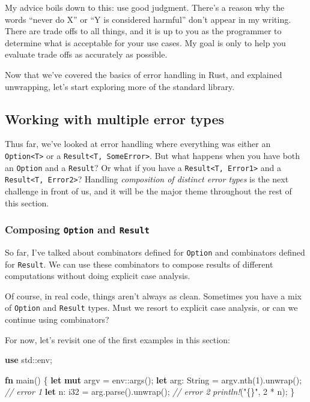 \documentclass[a4paper,]{book}
\renewcommand*{\hypertarget}[3][\ar]{%
  \def\ar{#2}%
  \label{#1}%
  #3}
\newenvironment{Shaded}{\begin{snugshade}}{\end{snugshade}}
\newcommand{\KeywordTok}[1]{\textcolor[rgb]{0.13,0.29,0.53}{\textbf{{#1}}}}
\newcommand{\DataTypeTok}[1]{\textcolor[rgb]{0.13,0.29,0.53}{{#1}}}
\newcommand{\DecValTok}[1]{\textcolor[rgb]{0.00,0.00,0.81}{{#1}}}
\newcommand{\StringTok}[1]{\textcolor[rgb]{0.31,0.60,0.02}{{#1}}}
\newcommand{\CommentTok}[1]{\textcolor[rgb]{0.56,0.35,0.01}{\textit{{#1}}}}
\newcommand{\PreprocessorTok}[1]{\textcolor[rgb]{0.56,0.35,0.01}{\textit{{#1}}}}
\newcommand{\NormalTok}[1]{{#1}}
\begin{document}
My advice boils down to this: use good judgment. There's a reason why
the words ``never do X'' or ``Y is considered harmful'' don't appear in
my writing. There are trade offs to all things, and it is up to you as
the programmer to determine what is acceptable for your use cases. My
goal is only to help you evaluate trade offs as accurately as possible.

Now that we've covered the basics of error handling in Rust, and
explained unwrapping, let's start exploring more of the standard
library.

\hypertarget{working-with-multiple-error-types}{\subsection{Working with
multiple error types}\label{working-with-multiple-error-types}}

Thus far, we've looked at error handling where everything was either an
\texttt{Option\textless{}T\textgreater{}} or a
\texttt{Result\textless{}T,\ SomeError\textgreater{}}. But what happens
when you have both an \texttt{Option} and a \texttt{Result}? Or what if
you have a \texttt{Result\textless{}T,\ Error1\textgreater{}} and a
\texttt{Result\textless{}T,\ Error2\textgreater{}}? Handling
\emph{composition of distinct error types} is the next challenge in
front of us, and it will be the major theme throughout the rest of this
section.

\hypertarget{composing-option-and-result}{\subsubsection{\texorpdfstring{Composing
\texttt{Option} and
\texttt{Result}}{Composing Option and Result}}\label{composing-option-and-result}}

So far, I've talked about combinators defined for \texttt{Option} and
combinators defined for \texttt{Result}. We can use these combinators to
compose results of different computations without doing explicit case
analysis.

Of course, in real code, things aren't always as clean. Sometimes you
have a mix of \texttt{Option} and \texttt{Result} types. Must we resort
to explicit case analysis, or can we continue using combinators?

For now, let's revisit one of the first examples in this section:

\begin{Shaded}
\begin{Highlighting}[]
\KeywordTok{use} \NormalTok{std::env;}

\KeywordTok{fn} \NormalTok{main() \{}
    \KeywordTok{let} \KeywordTok{mut} \NormalTok{argv = env::args();}
    \KeywordTok{let} \NormalTok{arg: }\DataTypeTok{String} \NormalTok{= argv.nth(}\DecValTok{1}\NormalTok{).unwrap(); }\CommentTok{// error 1}
    \KeywordTok{let} \NormalTok{n: }\DataTypeTok{i32} \NormalTok{= arg.parse().unwrap(); }\CommentTok{// error 2}
    \PreprocessorTok{println!}\NormalTok{(}\StringTok{"\{\}"}\NormalTok{, }\DecValTok{2} \NormalTok{* n);}
\NormalTok{\}}
\end{Highlighting}
\end{Shaded}
\end{document}
